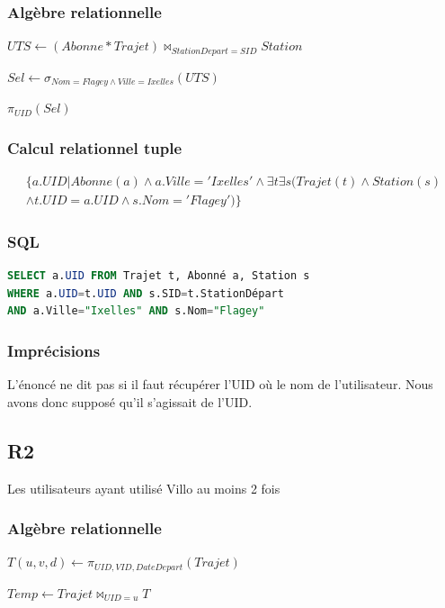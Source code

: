 \documentclass[a4paper, 12pt]{report}
\begin{document}
\subsubsection*{Algèbre relationnelle}

$UTS\leftarrow (Abonne * Trajet)\bowtie_{StationDepart=SID} Station$

$Sel\leftarrow \sigma_{Nom=Flagey\wedge Ville=Ixelles}(UTS)$

$\pi_{UID}(Sel)$

\subsubsection*{Calcul relationnel tuple}

\begin{multline*}
\{  a.UID | Abonne(a)\wedge a.Ville='Ixelles' \wedge \exists t \exists s ( Trajet(t)\wedge Station(s) \\\wedge t.UID=a.UID \wedge s.Nom='Flagey')   \} 
\end{multline*}

\subsubsection*{SQL}
\begin{lstlisting}[language=sql]
SELECT a.UID FROM Trajet t, Abonné a, Station s 
WHERE a.UID=t.UID AND s.SID=t.StationDépart
AND a.Ville="Ixelles" AND s.Nom="Flagey"
\end{lstlisting}

\subsubsection*{Imprécisions}

L'énoncé ne dit pas si il faut récupérer l'UID où le nom de l'utilisateur. Nous avons donc supposé qu'il s'agissait de l'UID.

\subsection*{R2}

Les utilisateurs ayant utilisé Villo au moins 2 fois
\subsubsection*{Algèbre relationnelle}

$T(u,v,d) \leftarrow\pi_{UID,VID,DateDepart}(Trajet)$

$Temp\leftarrow Trajet\bowtie_{UID=u}T $
\end{document}
